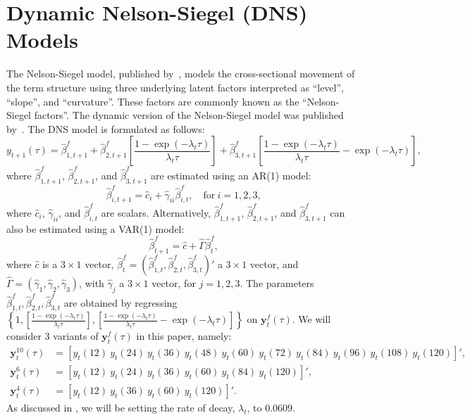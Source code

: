 \section{Dynamic Nelson-Siegel (DNS) Models}
\label{sec:dns}
The Nelson-Siegel model, published by~\textcite{Nelson1987}, models the cross-sectional movement of the term structure using three underlying latent factors interpreted as \enquote{level}, \enquote{slope}, and \enquote{curvature}. 
These factors are commonly known as the \enquote{Nelson-Siegel factors}. 
The dynamic version of the Nelson-Siegel model was published by~\textcite[hereafter DNS]{Diebold2006}. 
The DNS model is formulated as follows:
\begin{equation}
	y_{t+1}(\tau) = \hat{\beta}_{1,t+1}^{f} + \hat{\beta}_{2,t+1}^{f} \left[\frac{1-\exp(-\lambda_t \tau)}{\lambda_t \tau}\right] + \hat{\beta}_{3,t+1}^{f} \left[\frac{1-\exp(-\lambda_t \tau)}{\lambda_t \tau} - \exp(-\lambda_t \tau)\right],
\end{equation}
where $\hat{\beta}_{1,t+1}^{f}$, $\hat{\beta}_{2,t+1}^{f}$, and $\hat{\beta}_{3,t+1}^{f}$ are estimated using an AR(1) model:
\begin{equation}
\label{eq:dnsar}
	\hat{\beta}_{i,t+1}^{f} = \hat{c}_i + \hat{\gamma}_{ii} \hat{\beta}_{i,t}^f, \quad \text{for}~i = 1,2,3,
\end{equation}
where $\hat{c}_i$, $\hat{\gamma}_{ii}$, and $\hat{\beta}_{i,t}^f$ are scalars. 
Alternatively, $\hat{\beta}_{1,t+1}^{f}$, $\hat{\beta}_{2,t+1}^{f}$, and $\hat{\beta}_{3,t+1}^{f}$ can also be estimated using a VAR(1) model:
\begin{equation}
\label{eq:dnsvar}
	\hat{\beta}_{t+1}^{f} = \hat{c} + \hat{\Gamma} \hat{\beta}_t^f,
\end{equation}
where $\hat{c}$ is a $3 \times 1$ vector, $\hat{\beta}_t^f = \left(\hat{\beta}_{1,t}^f, \hat{\beta}_{2,t}^f, \hat{\beta}_{3,t}^f\right)'$ a $3 \times 1$ vector, and $\hat{\Gamma} = \left(\hat{\gamma}_1, \hat{\gamma}_2, \hat{\gamma}_3 \right)$, with $\hat{\gamma}_j$ a $3 \times 1$ vector, for $j = 1,2,3$. 
The parameters $\hat{\beta}_{1,t}^f, \hat{\beta}_{2,t}^f, \hat{\beta}_{3,t}^f$ are obtained by regressing $\left\{1, \left[\frac{1-\exp(-\lambda_t \tau)}{\lambda_t \tau}\right], \left[\frac{1-\exp(-\lambda_t \tau)}{\lambda_t \tau} - \exp(-\lambda_t \tau)\right] \right\}$ on $\mathbf{y}_t^f(\tau)$. 
We will consider 3 variants of $\mathbf{y}_t^f(\tau)$ in this paper, namely:
\begin{align*}
	\mathbf{y}_t^{10}(\tau) &= \left[y_t(12)~y_t(24)~y_t(36)~y_t(48)~y_t(60)~y_t(72)~y_t(84)~y_t(96)~y_t(108)~y_t(120) \right]', \\
	\mathbf{y}_t^6(\tau) &= \left[y_t(12)~y_t(24)~y_t(36)~y_t(60)~y_t(84)~y_t(120) \right]', \\
	\mathbf{y}_t^4(\tau) &= \left[y_t(12)~y_t(36)~y_t(60)~y_t(120) \right]'.
\end{align*}
As discussed in \textcite{Diebold2006}, we will be setting the rate of decay, $\lambda_t$, to $0.0609$.

